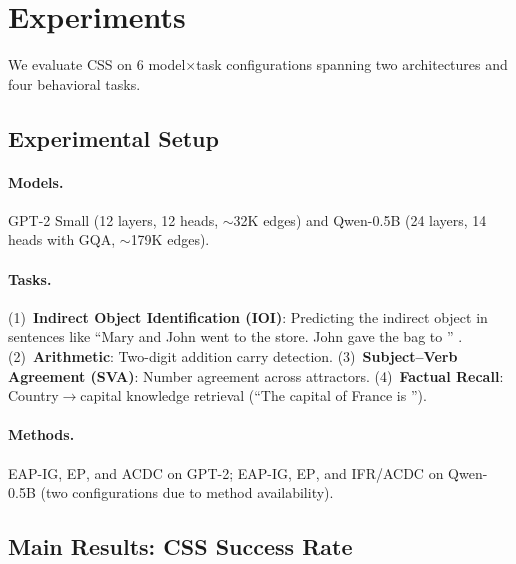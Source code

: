 \documentclass[11pt,a4paper]{article}
\newcommand{\css}{\textsc{CSS}}
\newcommand{\eapig}{\textsc{EAP-IG}}
\newcommand{\acdc}{\textsc{ACDC}}
\newcommand{\ep}{\textsc{EP}}
\newcommand{\ifr}{\textsc{IFR}}
\begin{document}
\section{Experiments}
\label{sec:experiments}

We evaluate \css{} on 6 model$\times$task configurations spanning two architectures and four behavioral tasks.

\subsection{Experimental Setup}

\paragraph{Models.} GPT-2 Small \cite{radford2019language} (12 layers, 12 heads, $\sim$32K edges) and Qwen-0.5B \cite{bai2023qwen} (24 layers, 14 heads with GQA, $\sim$179K edges).

\paragraph{Tasks.} (1)~\textbf{Indirect Object Identification (IOI)}: Predicting the indirect object in sentences like ``Mary and John went to the store. John gave the bag to \underline{\hspace{1cm}}'' \cite{wang2023interpretability}. (2)~\textbf{Arithmetic}: Two-digit addition carry detection. (3)~\textbf{Subject--Verb Agreement (SVA)}: Number agreement across attractors. (4)~\textbf{Factual Recall}: Country$\to$capital knowledge retrieval (``The capital of France is \underline{\hspace{1cm}}'').

\paragraph{Methods.} \eapig{}, \ep{}, and \acdc{} on GPT-2; \eapig{}, \ep{}, and \ifr{}/\acdc{} on Qwen-0.5B (two configurations due to method availability).

\subsection{Main Results: CSS Success Rate}
\label{sec:main-results}
\end{document}
